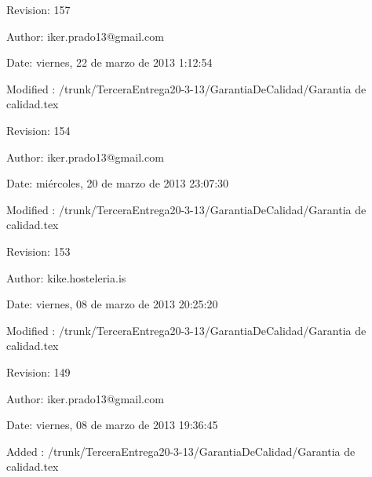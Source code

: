 \documentclass[spanish,a4paper,11pt, twoside]{report}	%
\begin{document}
	Revision: 157
	
	Author: iker.prado13@gmail.com	
	
	Date: viernes, 22 de marzo de 2013 1:12:54
	
	Modified : /trunk/TerceraEntrega20-3-13/GarantiaDeCalidad/Garantia de calidad.tex

	\vspace{0.25cm}

	Revision: 154
	
	Author: iker.prado13@gmail.com
	
	Date: miércoles, 20 de marzo de 2013 23:07:30
	
	Modified : /trunk/TerceraEntrega20-3-13/GarantiaDeCalidad/Garantia de calidad.tex


	\vspace{0.25cm}

	Revision: 153
	
	Author: kike.hosteleria.is	
	
	Date: viernes, 08 de marzo de 2013 20:25:20
	
	Modified : /trunk/TerceraEntrega20-3-13/GarantiaDeCalidad/Garantia de calidad.tex

	\vspace{0.25cm}

	Revision: 149
	
	Author: iker.prado13@gmail.com
	
	Date: viernes, 08 de marzo de 2013 19:36:45
	
	Added : /trunk/TerceraEntrega20-3-13/GarantiaDeCalidad/Garantia de calidad.tex


\newpage
\mbox{}
\thispagestyle{empty}						%
\newpage
\end{document}
